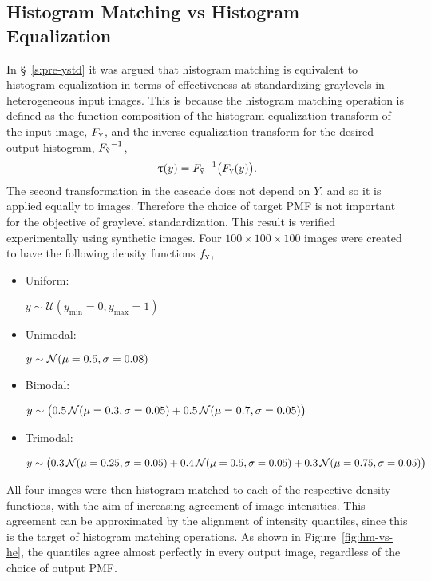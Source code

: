 \subsection{Histogram Matching vs Histogram Equalization}\label{ss:hm-vs-he}
In \S~\ref{s:pre-ystd} it was argued that
histogram matching is equivalent to histogram equalization
in terms of effectiveness at standardizing graylevels in heterogeneous input images.
This is because the histogram matching operation is defined as
the function composition of the histogram equalization transform of the input image, $F_{\textsc{y}}$,
and the inverse equalization transform for the desired output histogram, ${F_{\tilde{\textsc{y}}}}^{-1}$,
\begin{equation}
  \uptau(y) = {F_{\tilde{\textsc{y}}}}^{-1}\big(F_{\textsc{y}}(y)\big).
\end{equation}
The second transformation in the cascade does not depend on $Y$,
and so it is applied equally to images.
Therefore the choice of target PMF is not important for the objective of graylevel standardization.
This result is verified experimentally using synthetic images.
Four $100\times100\times100$ images were created to have the following density functions $f_{\textsc{y}}$,
\begin{itemize}[itemsep=0pt,topsep=0pt]
  \item \parbox{2cm}{Uniform:}
  $y\sim\mathcal{U}(y_{\min}=0,y_{\max}=1)$
  \item \parbox{2cm}{Unimodal:}
  $y\sim\mathcal{N}(\mu=0.5,\sigma=0.08)$
  \item \parbox{2cm}{Bimodal:}
  $y\sim\big(0.5\thinspace\mathcal{N}(\mu=0.3,\sigma=0.05)
            +0.5\thinspace\mathcal{N}(\mu=0.7,\sigma=0.05)\big)$
  \item \parbox{2cm}{Trimodal:}
  $y\sim\big(0.3\thinspace\mathcal{N}(\mu=0.25,\sigma=0.05)
            +0.4\thinspace\mathcal{N}(\mu=0.5,\sigma=0.05)
            +0.3\thinspace\mathcal{N}(\mu=0.75,\sigma=0.05)\big)$
\end{itemize}
All four images were then histogram-matched to each of the respective density functions,
with the aim of increasing agreement of image intensities.
This agreement can be approximated by the alignment of intensity quantiles,
since this is the target of histogram matching operations.
As shown in Figure~\ref{fig:hm-vs-he}, the quantiles agree almost perfectly in every output image,
regardless of the choice of output PMF.
